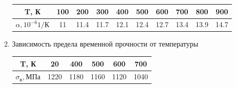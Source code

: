 \documentclass[a4paper,10pt]{article}
\begin{document}
\begin{enumerate}
\begin{enumerate}
	\begin{tabular}{|c|c|c|c|c|c|c|c|c|c|}
	\hline 
	T, К & 100 & 200 & 300 & 400 & 500 & 600 & 700 & 800 & 900 \\ 
	\hline 
	$\alpha, 10^{-6} 1/К$ & 11 & 11.4 & 11.7 & 12.1 & 12.4 & 12.7 & 13.4 & 13.9 & 14.7 \\ 
	\hline 
	\end{tabular} 
	
	\item Зависимость предела временной прочности от температуры
	
	\begin{tabular}{|c|c|c|c|c|c|}
		\hline 
		T, К & 20 & 400 & 500 & 600 & 700 \\ 
		\hline 
		$\sigma_в, МПа$ & 1220 & 1180 & 1160 & 1120 & 1040 \\ 
		\hline 
		\end{tabular} 	
	
\end{enumerate}
\end{enumerate}
\end{document}
